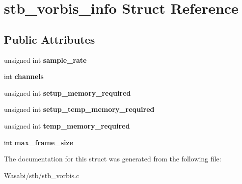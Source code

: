 \hypertarget{structstb__vorbis__info}{}\section{stb\+\_\+vorbis\+\_\+info Struct Reference}
\label{structstb__vorbis__info}
\subsection*{Public Attributes}
\begin{DoxyCompactItemize}
\item 
unsigned int {\bfseries sample\+\_\+rate}\hypertarget{structstb__vorbis__info_a9ccd1991052734f88a4bd3743b749993}{}\label{structstb__vorbis__info_a9ccd1991052734f88a4bd3743b749993}

\item 
int {\bfseries channels}\hypertarget{structstb__vorbis__info_a074f6af8c99f6c583696d34bf4c7744a}{}\label{structstb__vorbis__info_a074f6af8c99f6c583696d34bf4c7744a}

\item 
unsigned int {\bfseries setup\+\_\+memory\+\_\+required}\hypertarget{structstb__vorbis__info_a3dd3e567beb2bb9d7d62dcca83f301fb}{}\label{structstb__vorbis__info_a3dd3e567beb2bb9d7d62dcca83f301fb}

\item 
unsigned int {\bfseries setup\+\_\+temp\+\_\+memory\+\_\+required}\hypertarget{structstb__vorbis__info_aec05c013773be9d8d52f9bb784bdc084}{}\label{structstb__vorbis__info_aec05c013773be9d8d52f9bb784bdc084}

\item 
unsigned int {\bfseries temp\+\_\+memory\+\_\+required}\hypertarget{structstb__vorbis__info_a2fe235656197249fc3a6b5e27ff2da82}{}\label{structstb__vorbis__info_a2fe235656197249fc3a6b5e27ff2da82}

\item 
int {\bfseries max\+\_\+frame\+\_\+size}\hypertarget{structstb__vorbis__info_ad07f41541db438dcdac6ca223c5876e9}{}\label{structstb__vorbis__info_ad07f41541db438dcdac6ca223c5876e9}

\end{DoxyCompactItemize}


The documentation for this struct was generated from the following file\+:\begin{DoxyCompactItemize}
\item 
Wasabi/stb/stb\+\_\+vorbis.\+c\end{DoxyCompactItemize}
